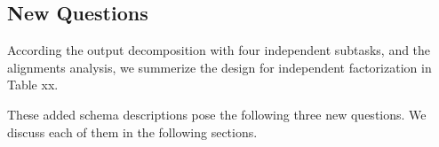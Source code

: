 \subsection{New Questions}
\label{ssec:sgd:new-questions}
According the output decomposition with four independent subtasks, and
the alignments analysis, we summerize the design for independent
factorization in Table xx.

These added schema descriptions pose the following three new
questions. We discuss each of them in the following sections.
\\
\setlength{\fboxsep}{1.5pt} 


